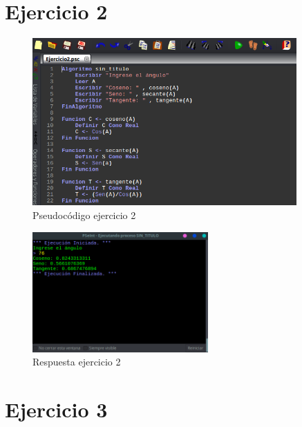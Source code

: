 \documentclass[11pt, a4paper]{report}
\begin{document}
 \newpage	
\section*{Ejercicio 2}

\begin{figure}[!ht]
\begin{center}
  \includegraphics[width=0.9\textwidth]{ejercicio2.png}
  \caption{Pseudoc\'odigo ejercicio 2}
\end{center}
\end{figure}

\begin{figure}[!ht]
\begin{center}
  \includegraphics[width=0.6\textwidth]{respuesta3.png}
  \caption{Respuesta ejercicio 2}
\end{center}
\end{figure}

\newpage
\section*{Ejercicio 3}
\end{document}
